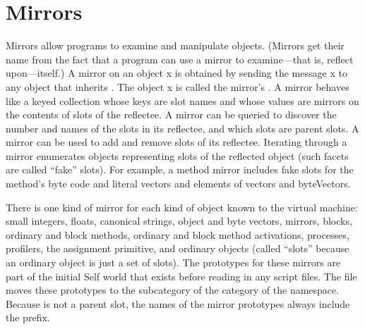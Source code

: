 \documentclass[letterpaper,10pt,english]{sphinxmanual}
\begin{document}
\section{Mirrors}
\label{\detokenize{mirrors::doc}}\label{\detokenize{mirrors:mirrors}}
\begin{sphinxVerbatim}[commandchars=\\\{\}]
         
         
         
             
             
                 
                 
         
         
         
              
                 
                     
                     
                     
         
         
         
         
\end{sphinxVerbatim}

Mirrors allow programs to examine and manipulate objects. (Mirrors get their name from the fact
that a program can use a mirror to examine—that is, reflect upon—itself.) A mirror on an object x
is obtained by sending the message  x to any object that inherits .
The object x is called the mirror’s . A mirror behaves like a keyed collection whose keys
are slot names and whose values are mirrors on the contents of slots of the reflectee. A mirror can
be queried to discover the number and names of the slots in its reflectee, and which slots are parent
slots. A mirror can be used to add and remove slots of its reflectee. Iterating through a mirror enumerates
objects representing slots of the reflected object (such facets are called “fake” slots). For
example, a method mirror includes fake slots for the method’s byte code and literal vectors and elements
of vectors and byteVectors.

There is one kind of mirror for each kind of object known to the virtual machine: small integers,
floats, canonical strings, object and byte vectors, mirrors, blocks, ordinary and block methods, ordinary
and block method activations, processes, profilers, the assignment primitive, and ordinary
objects (called “slots” because an ordinary object is just a set of slots). The prototypes for these
mirrors are part of the initial Self world that exists before reading in any script files. The file
 moves these prototypes to the  subcategory of the  category of
the  namespace. Because  is not a parent slot, the names of the mirror prototypes
always include the  prefix.
\end{document}

